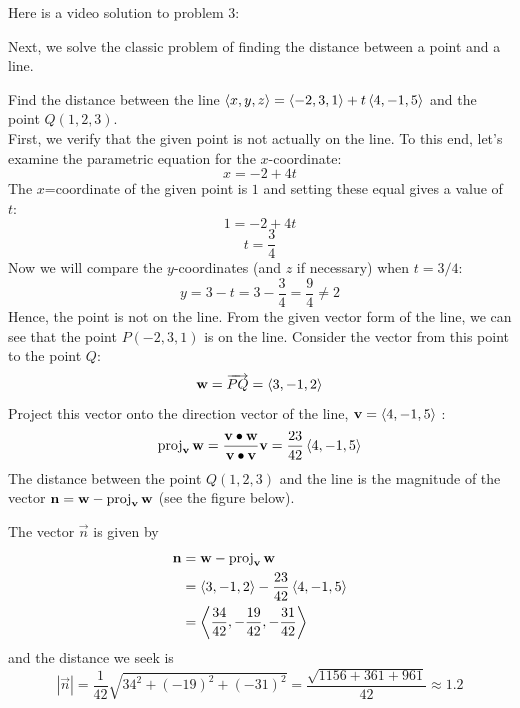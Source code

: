 \documentclass[handout]{ximera}
\begin{document}
Here is a video solution to problem 3:\\
\begin{foldable}
\end{foldable}

Next, we solve the classic problem of finding the distance between a point and a line.

\begin{example}[Example 4]
Find the distance between the line $\left\langle x,y,z\right\rangle = \left\langle -2,3,1\right\rangle + t \left\langle 4,-1,5\right\rangle$ and the point $Q(1, 2, 3)$.\\
First, we verify that the given point is not actually on the line. 
To this end, let's examine the parametric equation for the $x$-coordinate:
\[
x = -2 + 4t
\]
The $x$=coordinate of the given point is $1$ and setting these equal gives a value of $t$:
\[
1 = -2 + 4t
\]
\[
t = \frac34
\]
Now we will compare the $y$-coordinates (and $z$ if necessary) when $t= 3/4$:
\[
y = 3 - t = 3 -\frac34 = \frac94 \neq 2
\]
Hence, the point is not on the line.
From the given vector form of the line, we can see that the point $P(-2, 3, 1)$ is on the line.  
Consider the vector from this point to the point $Q$:
\[
\mathbf{w} = \overrightarrow{PQ} = \left\langle 3, -1, 2\right\rangle
\]
Project this vector onto the direction vector of the line, $\mathbf{v} = \left\langle 4, -1, 5\right\rangle$ :
\[
\operatorname{proj}_{\mathbf{v}}\mathbf{w} = \frac{\mathbf{v} \bullet \mathbf{w}}{\mathbf{v} \bullet \mathbf{v}}\mathbf{v} = \frac{23}{42}\left\langle 4,-1,5\right\rangle
\]
The distance between the point $Q(1, 2, 3)$ and the line is the magnitude of the 
vector $\mathbf{n} = \mathbf{w} - \operatorname{proj}_{\mathbf{v}}\mathbf{w}$ (see the figure below).



\begin{image}
\end{image}

The vector $\vec{n}$ is given by
\begin{align*}
\mathbf{n} &= \mathbf{w} -  \operatorname{proj}_{\mathbf{v}} \mathbf{w}\\
&=\left\langle 3, -1, 2\right\rangle - \frac{23}{42}\left\langle 4,-1,5\right\rangle \\
&= \left\langle \frac{34}{42},-\frac{19}{42},-\frac{31}{42}\right\rangle
\end{align*}
and the distance we seek is
\[
|\vec{n}| = \frac{1}{42}\sqrt{ 34^2 +  \left(-19\right)^2 + \left(-31\right)^2} = \frac{\sqrt{1156+361+961}}{42} \approx 1.2
\]

\end{example}
\end{document}
